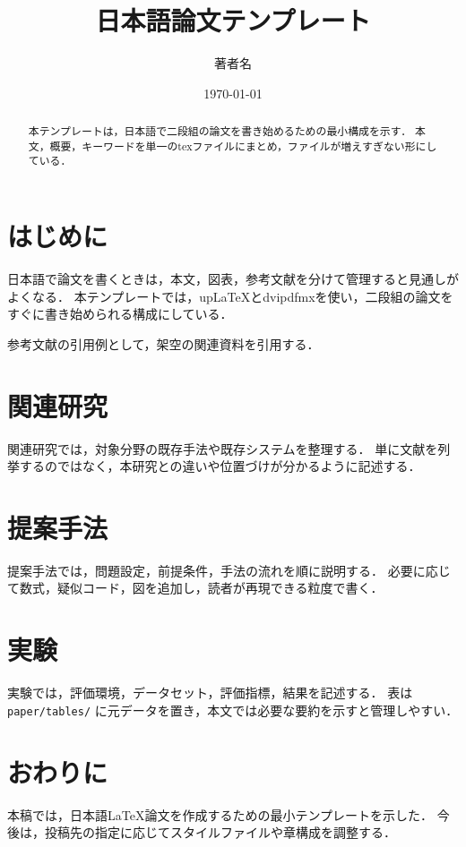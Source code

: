 \documentclass[uplatex,dvipdfmx,twocolumn]{jsarticle}
\title{日本語論文テンプレート}
\author{著者名}
\date{\today}
\begin{document}
\maketitle

\begin{abstract}
本テンプレートは，日本語で二段組の論文を書き始めるための最小構成を示す．
本文，概要，キーワードを単一のtexファイルにまとめ，ファイルが増えすぎない形にしている．
\end{abstract}


\section{はじめに}

日本語で論文を書くときは，本文，図表，参考文献を分けて管理すると見通しがよくなる．
本テンプレートでは，upLaTeXとdvipdfmxを使い，二段組の論文をすぐに書き始められる構成にしている．

参考文献の引用例として，架空の関連資料を引用する\cite{sample2026template}．

\section{関連研究}

関連研究では，対象分野の既存手法や既存システムを整理する．
単に文献を列挙するのではなく，本研究との違いや位置づけが分かるように記述する．

\section{提案手法}

提案手法では，問題設定，前提条件，手法の流れを順に説明する．
必要に応じて数式，疑似コード，図を追加し，読者が再現できる粒度で書く．

\section{実験}

実験では，評価環境，データセット，評価指標，結果を記述する．
表は \texttt{paper/tables/} に元データを置き，本文では必要な要約を示すと管理しやすい．


\section{おわりに}

本稿では，日本語LaTeX論文を作成するための最小テンプレートを示した．
今後は，投稿先の指定に応じてスタイルファイルや章構成を調整する．


\end{document}
